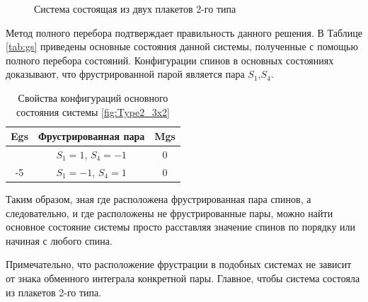 \documentclass[utf8, babel, sor, jor, amsmath, amssymb, reprint]{elsarticle} %
\begin{document}
\begin{figure}[H]
	\centering
	\begin{minipage}{0.3\textwidth}
		\centering
		\caption{Система состоящая из двух плакетов 2-го типа}
		\label{fig:Type2_3x2}
	\end{minipage}
\end{figure}

Метод полного перебора подтверждает правильность данного решения. В Таблице \eqref{tab:gs} приведены основные состояния данной системы, полученные с помощью полного перебора состояний. Конфигурации спинов в основных состояниях доказывают, что фрустрированной парой является пара $S_1$,$S_4$. 

\begin{table}[H]
	\centering
	\begin{tabular}{|c|c|c|}
		\hline
		Egs   &   Фрустрированная пара & Mgs\\
		\hline
		&  $S_1=1$, $S_4=-1$ & 0 \\
		\cline{2-3}
		-5	\multirow{3}{*}{}
		&   $S_1=-1$, $S_4=1$ & 0 \\
		\hline
	\end{tabular}
	\caption{Свойства конфигураций основного состояния системы \eqref{fig:Type2_3x2} }
	\label{tab:gs}
\end{table}

Таким образом, зная где расположена фрустрированная пара спинов, а следовательно, и где расположены не фрустрированные пары, можно найти основное состояние системы просто расставляя значение спинов по порядку или начиная с любого спина. 

Примечательно, что расположение фрустрации в подобных системах не зависит от знака обменного интеграла конкретной пары. Главное, чтобы система состояла из плакетов 2-го типа.
\end{document}
